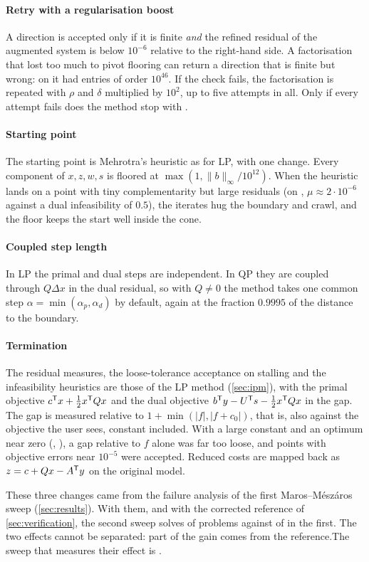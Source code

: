 \paragraph{Retry with a regularisation boost}
A direction is accepted only if it is finite \emph{and} the refined residual of the augmented system
is below $10^{-6}$ relative to the right-hand side. A factorisation that lost too much to pivot
flooring can return a direction that is finite but wrong: on  it had entries of order
$10^{46}$. If the check fails, the factorisation is repeated with $\rho$ and $\delta$ multiplied by
$10^2$, up to five attempts in all. Only if every attempt fails does the method stop with
.

\paragraph{Starting point}
The starting point is Mehrotra's heuristic as for LP, with one change. Every component of $x,z,w,s$
is floored at $\max(1,\|b\|_\infty/10^{12})$. When the heuristic lands on a point with tiny
complementarity but large residuals (on , $\mu\approx2\cdot10^{-6}$ against a dual
infeasibility of $0.5$), the iterates hug the boundary and crawl, and the floor keeps the start well
inside the cone.

\paragraph{Coupled step length}
In LP the primal and dual steps are independent. In QP they are coupled through $Q\Delta x$ in the
dual residual, so with $Q\ne0$ the method takes one common step $\alpha=\min(\alpha_p,\alpha_d)$ by
default, again at the fraction $0.9995$ of the distance to the boundary.

\paragraph{Termination}
The residual measures, the loose-tolerance acceptance on stalling and the infeasibility heuristics are
those of the LP method (\cref{sec:ipm}), with the primal objective $c^{\mathsf{T}} x+\frac12x^{\mathsf{T}} Qx$ and the dual
objective $b^{\mathsf{T}} y-U^{\mathsf{T}} s-\frac12 x^{\mathsf{T}} Qx$ in the gap. The gap is measured relative to
$1+\min(|f|,|f+c_0|)$, that is, also against the objective the user sees, constant included. With a
large constant and an optimum near zero (, ), a gap relative to $f$ alone
was far too loose, and points with objective errors near $10^{-5}$ were accepted. Reduced costs are
mapped back as $z=c+Qx-A^{\mathsf{T}} y$ on the original model.

These three changes came from the failure analysis of the first Maros--Mészáros sweep
(\cref{sec:results}). \ifnum{} With them, and with the corrected reference of
\cref{sec:verification}, the second sweep solves \nQp{} of \nQpTot{} problems against \nQpVone{} of
\nQpVoneTot{} in the first. The two effects cannot be separated: part of the gain comes from the
reference.\else The sweep that measures their effect is .\fi
